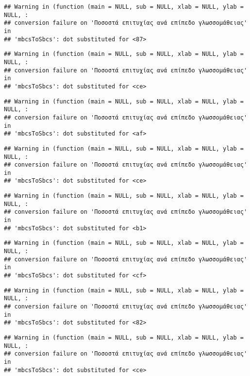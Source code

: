 \documentclass[
]{article}
\begin{document}
\begin{verbatim}
## Warning in (function (main = NULL, sub = NULL, xlab = NULL, ylab = NULL, :
## conversion failure on 'Ποσοστά επιτυχίας ανά επίπεδο γλωσσομάθειας' in
## 'mbcsToSbcs': dot substituted for <87>
\end{verbatim}

\begin{verbatim}
## Warning in (function (main = NULL, sub = NULL, xlab = NULL, ylab = NULL, :
## conversion failure on 'Ποσοστά επιτυχίας ανά επίπεδο γλωσσομάθειας' in
## 'mbcsToSbcs': dot substituted for <ce>
\end{verbatim}

\begin{verbatim}
## Warning in (function (main = NULL, sub = NULL, xlab = NULL, ylab = NULL, :
## conversion failure on 'Ποσοστά επιτυχίας ανά επίπεδο γλωσσομάθειας' in
## 'mbcsToSbcs': dot substituted for <af>
\end{verbatim}

\begin{verbatim}
## Warning in (function (main = NULL, sub = NULL, xlab = NULL, ylab = NULL, :
## conversion failure on 'Ποσοστά επιτυχίας ανά επίπεδο γλωσσομάθειας' in
## 'mbcsToSbcs': dot substituted for <ce>
\end{verbatim}

\begin{verbatim}
## Warning in (function (main = NULL, sub = NULL, xlab = NULL, ylab = NULL, :
## conversion failure on 'Ποσοστά επιτυχίας ανά επίπεδο γλωσσομάθειας' in
## 'mbcsToSbcs': dot substituted for <b1>
\end{verbatim}

\begin{verbatim}
## Warning in (function (main = NULL, sub = NULL, xlab = NULL, ylab = NULL, :
## conversion failure on 'Ποσοστά επιτυχίας ανά επίπεδο γλωσσομάθειας' in
## 'mbcsToSbcs': dot substituted for <cf>
\end{verbatim}

\begin{verbatim}
## Warning in (function (main = NULL, sub = NULL, xlab = NULL, ylab = NULL, :
## conversion failure on 'Ποσοστά επιτυχίας ανά επίπεδο γλωσσομάθειας' in
## 'mbcsToSbcs': dot substituted for <82>
\end{verbatim}

\begin{verbatim}
## Warning in (function (main = NULL, sub = NULL, xlab = NULL, ylab = NULL, :
## conversion failure on 'Ποσοστά επιτυχίας ανά επίπεδο γλωσσομάθειας' in
## 'mbcsToSbcs': dot substituted for <ce>
\end{verbatim}
\end{document}
